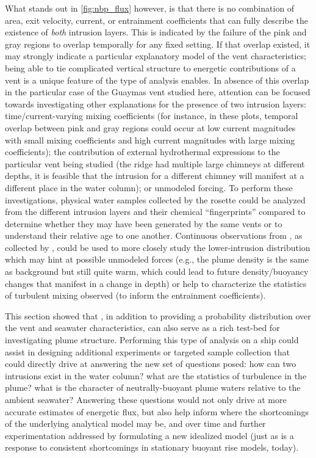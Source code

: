 What stands out in \cref{fig:nbp_flux} however, is that there is no combination of area, exit velocity, current, or entrainment coefficients that can fully describe the existence of \emph{both} intrusion layers. This is indicated by the failure of the pink and gray regions to overlap temporally for any fixed setting. If that overlap existed, it may strongly indicate a particular explanatory model of the vent characteristics; being able to tie complicated vertical structure to energetic contributions of a vent is a unique feature of the type of analysis \PHUMES enables. In absence of this overlap in the particular case of the Guaymas vent studied here, attention can be focused towards investigating other explanations for the presence of two intrusion layers: time/current-varying mixing coefficients (for instance, in these plots, temporal overlap between pink and gray regions could occur at low current magnitudes with small mixing coefficients and high current magnitudes with large mixing coefficients); the contribution of external hydrothermal expressions to the particular vent being studied (the ridge had multiple large chimneys at different depths, it is feasible that the intrusion for a different chimney will manifest at a different place in the water column); or unmodeled forcing. To perform these investigations, physical water samples collected by the rosette could be analyzed from the different intrusion layers and their chemical ``fingerprints'' compared to determine whether they may have been generated by the same vents or to understand their relative age to one another. Continuous observations from \Sentry, as collected by \PHORTEX, could be used to more closely study the lower-intrusion distribution which may hint at possible unmodeled forces (e.g., the plume density is the same as background but still quite warm, which could lead to future density/buoyancy changes that manifest in a change in depth) or help to characterize the statistics of turbulent mixing observed (to inform the entrainment coefficients).

This section showed that \PHUMES, in addition to providing a probability distribution over the vent and seawater characteristics, can also serve as a rich test-bed for investigating plume structure. Performing this type of analysis on a ship could assist in designing additional experiments or targeted sample collection that could directly drive at answering the new set of questions posed: how can two intrusions exist in the water column? what are the statistics of turbulence in the plume? what is the character of neutrally-buoyant plume waters relative to the ambient seawater? Answering these questions would not only drive at more accurate estimates of energetic flux, but also help inform where the shortcomings of the underlying analytical model may be, and over time and further experimentation addressed by formulating a new idealized model (just as \PHUMES is a response to consistent shortcomings in stationary buoyant rise models, today).


